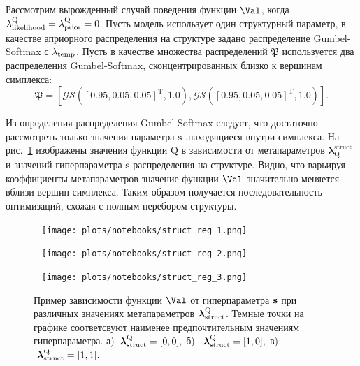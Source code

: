\begin{example} 
Рассмотрим вырожденный случай поведения функции $\Val$, когда $\lambda_\text{likelihood}^\text{Q} = \lambda_\text{prior}^\text{Q} = 0$. Пусть модель использует один структурный параметр, в качестве априорного распределения на структуре задано распределение Gumbel-Softmax с $\lambda_{\text{temp}}$. Пусть в качестве множества распределений $\mathfrak{P}$ используется два распределения Gumbel-Softmax, сконцентрированных близко к вершинам симплекса:
\[
    \mathfrak{P} = [\mathcal{GS}([0.95, 0.05, 0.05]^\text{T}, 1.0) ,\mathcal{GS}([0.95, 0.05, 0.05]^{\text{T}}, 1.0)].
\]

Из определения распределения Gumbel-Softmax следует, что достаточно рассмотреть только значения параметра $\mathbf{s}$ ,находящиеся внутри симплекса.
На рис.~\ref{fig:gs_comb} изображены значения функции Q в зависимости от метапараметров $\boldsymbol{\lambda}^\text{struct}_\text{Q}$ и значений гиперпараметра $\mathbf{s}$ распределения на структуре. Видно, что варьируя  коэффициенты метапараметров значение функции $\Val$ значительно меняется вблизи вершин симплекса. Таким образом получается последовательность оптимизаций, схожая с полным перебором структуры.
\end{example}


\begin{figure}
 \begin{minipage}[t]{.32\textwidth}
   \texttt{[image: plots/notebooks/struct\_reg\_1.png]}
\subcaption{}
\end{minipage}
\hfill
 \begin{minipage}[t]{.32\textwidth}
   \texttt{[image: plots/notebooks/struct\_reg\_2.png]}
\subcaption{}
\end{minipage}
\hfill
 \begin{minipage}[t]{.32\textwidth}
   \texttt{[image: plots/notebooks/struct\_reg\_3.png]}
\subcaption{}
\end{minipage}

\caption{Пример зависимости функции $\Val$ от гиперпараметра $\mathbf{s}$ при различных значениях метапараметров $\boldsymbol{\lambda}_\text{struct}^\text{Q}$. Темные точки на графике соответсвуют наименее предпочтительным значениям гиперпараметра. а)~$\boldsymbol{\lambda}_\text{struct}^\text{Q} = [0,0],$ б)~$~\boldsymbol{\lambda}_\text{struct}^\text{Q} = [1,0],$ в)~$~\boldsymbol{\lambda}_\text{struct}^\text{Q} = [1,1].$}
\label{fig:gs_comb}

\end{figure}

